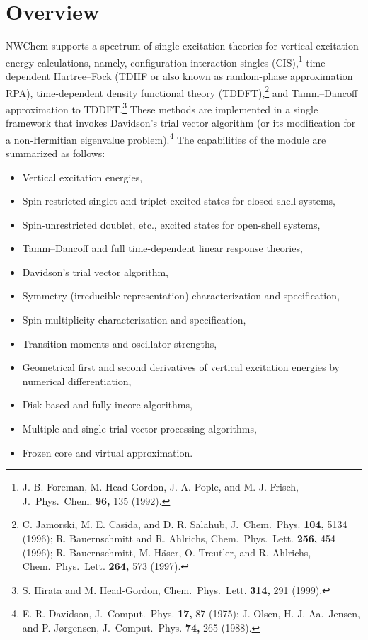 %
%
\label{sec:tddft}

\section{Overview}

NWChem supports a spectrum of single excitation theories for
vertical excitation energy calculations, namely, configuration interaction
singles (CIS),\footnote{J. B. Foreman, M. Head-Gordon, J. A. Pople, and M. J. Frisch, J.\ Phys.\ Chem. {\bf 96,} 135 (1992).} 
time-dependent Hartree--Fock (TDHF or also known as 
random-phase approximation RPA), time-dependent density functional
theory (TDDFT),\footnote{C. Jamorski, M. E. Casida, and D. R. Salahub, J.\ Chem.\ Phys. {\bf 104,} 5134 (1996);
R. Bauernschmitt and R. Ahlrichs, Chem.\ Phys.\ Lett. {\bf 256,} 454 (1996); 
R. Bauernschmitt, M. H\"{a}ser, O. Treutler, and R. Ahlrichs, Chem.\ Phys.\ Lett. {\bf 264,} 573 (1997).} 
and Tamm--Dancoff approximation to TDDFT.\footnote{ S. Hirata and M. Head-Gordon, Chem.\ Phys.\ Lett. {\bf 314,} 291 (1999).}
These methods
are implemented in a single framework that invokes Davidson's trial vector
algorithm (or its modification for a non-Hermitian eigenvalue problem).\footnote{E. R. Davidson, J.\ Comput.\ Phys. {\bf 17,} 87 (1975); J. Olsen, H. J. Aa.\ Jensen, and P. J\o rgensen, J.\ Comput.\ Phys. {\bf 74,} 265 (1988).}
The capabilities of the module are summarized as follows:
\begin{itemize}
\item Vertical excitation energies,
\item Spin-restricted singlet and triplet excited states for closed-shell systems,
\item Spin-unrestricted doublet, etc., excited states for open-shell systems,
\item Tamm--Dancoff and full time-dependent linear response theories,
\item Davidson's trial vector algorithm,
\item Symmetry (irreducible representation) characterization and specification,
\item Spin multiplicity characterization and specification,
\item Transition moments and oscillator strengths,
\item Geometrical first and second derivatives of vertical excitation energies 
by numerical differentiation,
\item Disk-based and fully incore algorithms,
\item Multiple and single trial-vector processing algorithms,
\item Frozen core and virtual approximation.
\end{itemize}

